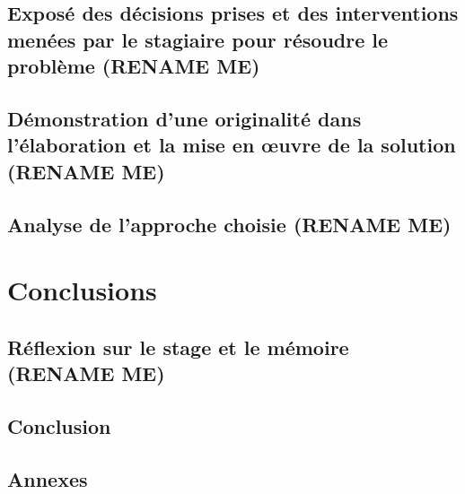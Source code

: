 \documentclass[12pt,a4paper,article]{memoir} %
\begin{document}
\section{Exposé des décisions prises et des interventions menées par le stagiaire pour résoudre le problème (RENAME ME) }

\paragraph{} \lipsum

\section{Démonstration d’une originalité dans l’élaboration et la mise en œuvre de la solution (RENAME ME) }

\paragraph{} \lipsum

\section{ Analyse de l’approche choisie (RENAME ME) }

\paragraph{} \lipsum

\newpage
\chapter{Conclusions}

\section{ Réflexion sur le stage et le mémoire (RENAME ME) }

\paragraph{} \lipsum

\section{ Conclusion }

\paragraph{} \lipsum

\section{ Annexes }

\paragraph{} \lipsum
\end{document}
